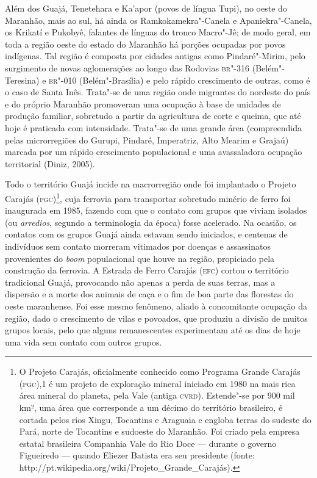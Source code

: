 Além dos Guajá, Tenetehara e Ka'apor (povos de língua Tupi), no oeste do
Maranhão, mais ao sul, há ainda os Ramkokamekra"-Canela e
Apaniekra"-Canela, os Krikatí e Pukobyê, falantes de línguas do tronco
Macro"-Jê; de modo geral, em toda a região oeste do estado do Maranhão há
porções ocupadas por povos indígenas. Tal região é composta por cidades
antigas como Pindaré"-Mirim, pelo surgimento de novas aglomerações ao
longo das Rodovias \textsc{br}"-316 (Belém"-Teresina) e \textsc{br}"-010 (Belém"-Brasília) e
pelo rápido crescimento de outras, como é o caso de Santa Inês. Trata"-se
de uma região onde migrantes do nordeste do país e do próprio Maranhão
promoveram uma ocupação à base de unidades de produção familiar,
sobretudo a partir da agricultura de corte e queima, que até hoje é
praticada com intensidade. Trata"-se de uma grande área (compreendida
pelas microrregiões do Gurupi, Pindaré, Imperatriz, Alto Mearim e
Grajaú) marcada por um rápido crescimento populacional e uma
avassaladora ocupação territorial (Diniz, 2005).

Todo o território Guajá incide na macrorregião onde foi implantado o
Projeto Carajás (\textsc{pgc})\footnote{O Projeto Carajás, oficialmente conhecido
  como Programa Grande Carajás (\textsc{pgc}),1 é um projeto de exploração mineral
  iniciado em 1980 na mais rica área mineral do planeta, pela Vale
  (antiga \textsc{cvrd}). Estende"-se por 900 mil km², uma área que corresponde a
  um décimo do território brasileiro, é cortada pelos rios Xingu,
  Tocantins e Araguaia e engloba terras do sudeste do Pará, norte de
  Tocantins e sudoeste do Maranhão. Foi criado pela empresa estatal
  brasileira Companhia Vale do Rio Doce --- durante o governo Figueiredo ---
  quando Eliezer Batista era seu presidente (fonte:
  http://pt.wikipedia.org/wiki/Projeto\_Grande\_Carajás).}, cuja
ferrovia para transportar sobretudo minério de ferro foi inaugurada em
1985, fazendo com que o contato com grupos que viviam isolados (ou
\emph{arredios}, segundo a terminologia da época) fosse acelerado. Na
ocasião, os contatos com os grupos Guajá ainda estavam sendo iniciados,
e centenas de indivíduos sem contato morreram vitimados por doenças e
assassinatos provenientes do \emph{boom} populacional que houve na
região, propiciado pela construção da ferrovia. A Estrada de Ferro
Carajás (\textsc{efc}) cortou o território tradicional Guajá, provocando não
apenas a perda de suas terras, mas a dispersão e a morte dos animais de
caça e o fim de boa parte das florestas do oeste maranhense. Foi esse
mesmo fenômeno, aliado à concomitante ocupação da região, dado o
crescimento de vilas e povoados, que produziu a divisão de muitos grupos
locais, pelo que alguns remanescentes experimentam até os dias de hoje
uma vida sem contato com outros grupos.

